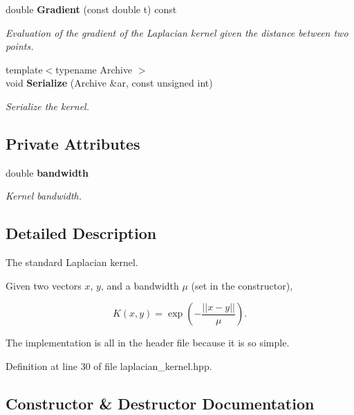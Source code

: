 \begin{DoxyCompactItemize}
double {\bf Gradient} (const double t) const 
\begin{DoxyCompactList}\small\item\em Evaluation of the gradient of the Laplacian kernel given the distance between two points. \end{DoxyCompactList}\item 
{\footnotesize template$<$typename Archive $>$ }\\void {\bf Serialize} (Archive \&ar, const unsigned int)
\begin{DoxyCompactList}\small\item\em Serialize the kernel. \end{DoxyCompactList}\end{DoxyCompactItemize}
\subsection*{Private Attributes}
\begin{DoxyCompactItemize}
\item 
double {\bf bandwidth}
\begin{DoxyCompactList}\small\item\em Kernel bandwidth. \end{DoxyCompactList}\end{DoxyCompactItemize}


\subsection{Detailed Description}
The standard Laplacian kernel. 

Given two vectors $ x $, $ y $, and a bandwidth $ \mu $ (set in the constructor),

\[ K(x, y) = \exp(-\frac{|| x - y ||}{\mu}). \]

The implementation is all in the header file because it is so simple. 

Definition at line 30 of file laplacian\+\_\+kernel.\+hpp.



\subsection{Constructor \& Destructor Documentation}
